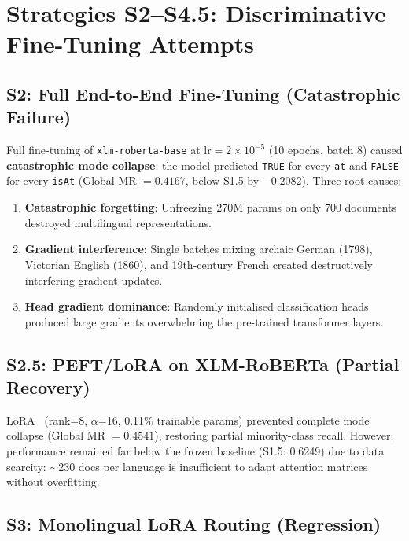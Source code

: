 \documentclass{ceurart}
\begin{document}
\section{Strategies S2--S4.5: Discriminative Fine-Tuning Attempts}
\label{sec:s2s4}

\subsection{S2: Full End-to-End Fine-Tuning (Catastrophic Failure)}

Full fine-tuning of \texttt{xlm-roberta-base} at lr$=2\times10^{-5}$ (10 epochs, batch 8) caused \textbf{catastrophic mode collapse}: the model predicted \texttt{TRUE} for every \texttt{at} and \texttt{FALSE} for every \texttt{isAt} (Global MR $= 0.4167$, below S1.5 by $-0.2082$). Three root causes:

\begin{enumerate}
  \item \textbf{Catastrophic forgetting}: Unfreezing 270M params on only 700 documents destroyed multilingual representations.
  \item \textbf{Gradient interference}: Single batches mixing archaic German (1798), Victorian English (1860), and 19th-century French created destructively interfering gradient updates.
  \item \textbf{Head gradient dominance}: Randomly initialised classification heads produced large gradients overwhelming the pre-trained transformer layers.
\end{enumerate}

\subsection{S2.5: PEFT/LoRA on XLM-RoBERTa (Partial Recovery)}

LoRA~\cite{hu2021lora} (rank=8, $\alpha$=16, 0.11\% trainable params) prevented complete mode collapse (Global MR $= 0.4541$), restoring partial minority-class recall. However, performance remained far below the frozen baseline (S1.5: 0.6249) due to data scarcity: $\sim$230 docs per language is insufficient to adapt attention matrices without overfitting.

\subsection{S3: Monolingual LoRA Routing (Regression)}
\end{document}
